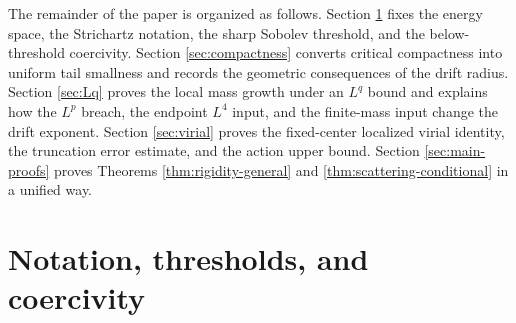 \documentclass[10pt,a4paper]{amsart}
\numberwithin{equation}{section}
\begin{document}
The remainder of the paper is organized as follows. Section \ref{sec:notation} fixes the energy space, the Strichartz notation, the sharp Sobolev threshold, and the below-threshold coercivity. Section \ref{sec:compactness} converts critical compactness into uniform tail smallness and records the geometric consequences of the drift radius. Section \ref{sec:Lq} proves the local mass growth under an $L^q$ bound and explains how the $L^p$ breach, the endpoint $L^4$ input, and the finite-mass input change the drift exponent. Section \ref{sec:virial} proves the fixed-center localized virial identity, the truncation error estimate, and the action upper bound. Section \ref{sec:main-proofs} proves Theorems \ref{thm:rigidity-general} and \ref{thm:scattering-conditional} in a unified way.

\section{Notation, thresholds, and coercivity}\label{sec:notation}
\end{document}
